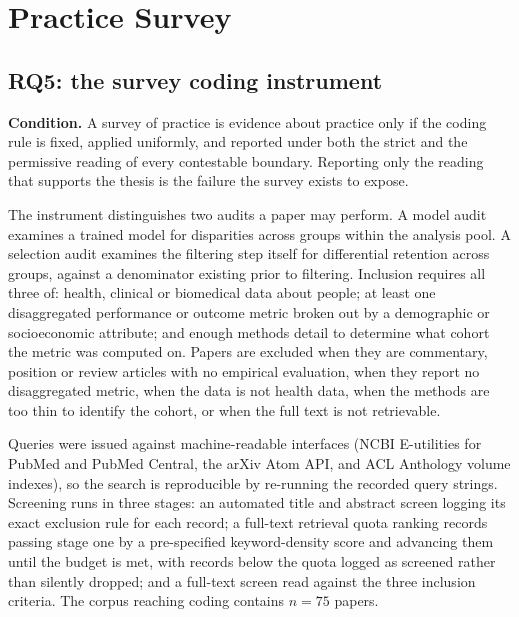 %

\section{Practice Survey}
\label{sup:s3}

\subsection{RQ5: the survey coding instrument}

\textbf{Condition.} A survey of practice is evidence about practice only if the coding rule is
fixed, applied uniformly, and reported under both the strict and the permissive reading of every
contestable boundary. Reporting only the reading that supports the thesis is the failure the survey
exists to expose.

The instrument distinguishes two audits a paper may perform. A model audit examines a trained model
for disparities across groups within the analysis pool. A selection audit examines the filtering
step itself for differential retention across groups, against a denominator existing prior to
filtering. Inclusion requires all three of: health, clinical or biomedical data about people; at
least one disaggregated performance or outcome metric broken out by a demographic or socioeconomic
attribute; and enough methods detail to determine what cohort the metric was computed on. Papers
are excluded when they are commentary, position or review articles with no empirical evaluation,
when they report no disaggregated metric, when the data is not health data, when the methods are
too thin to identify the cohort, or when the full text is not retrievable.

Queries were issued against machine-readable interfaces (NCBI E-utilities for PubMed and PubMed
Central, the arXiv Atom API, and ACL Anthology volume indexes), so the search is reproducible by
re-running the recorded query strings. Screening runs in three stages: an automated title and
abstract screen logging its exact exclusion rule for each record; a full-text retrieval quota
ranking records passing stage one by a pre-specified keyword-density score and advancing them until
the budget is met, with records below the quota logged as screened rather than silently dropped;
and a full-text screen read against the three inclusion criteria. The corpus reaching coding
contains $n = 75$ papers.

